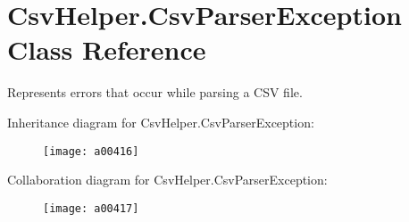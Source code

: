 \hypertarget{a00059}{\section{Csv\-Helper.\-Csv\-Parser\-Exception Class Reference}
\label{a00059}
}


Represents errors that occur while parsing a C\-S\-V file.  




Inheritance diagram for Csv\-Helper.\-Csv\-Parser\-Exception\-:
\nopagebreak
\begin{figure}[H]
\begin{center}
\leavevmode
\texttt{[image: a00416]}
\end{center}
\end{figure}


Collaboration diagram for Csv\-Helper.\-Csv\-Parser\-Exception\-:
\nopagebreak
\begin{figure}[H]
\begin{center}
\leavevmode
\texttt{[image: a00417]}
\end{center}
\end{figure}
